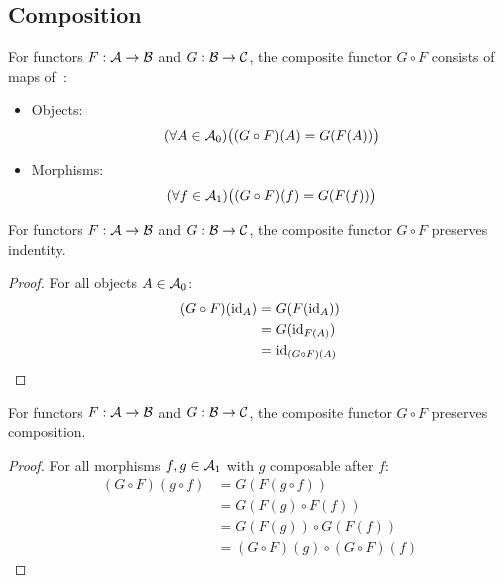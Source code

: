 \subsection{Composition}

\begin{definition}\label{def:functor_composition}

  For functors $F:\mathcal{A}\to \mathcal{B}$ and $G:\mathcal{B}\to \mathcal{C}$, the composite functor $G\circ F$
  consists of maps of~\parencite[p.~17]{leinster:basic_category_theory}:
  \begin{itemize}
    \item Objects:
      \[(\forall A \in \mathcal{A}_0)
        \big((G\circ F)(A) = G(F(A))\big)\]
    \item Morphisms:
      \[(\forall f\in \mathcal{A}_1)
        \big((G\circ F)(f) = G(F(f))\big)\]
  \end{itemize}
\end{definition}

\begin{theorem}
  For functors $F:\mathcal{A}\to \mathcal{B}$ and $G:\mathcal{B}\to \mathcal{C}$, the composite functor $G\circ F$
  preserves indentity.

  \begin{proof}
    For all objects $A\in \mathcal{A}_0$:
    \[
      \begin{aligned}
        (G\circ F)(\mathrm{id}_A)
        &= G(F(\mathrm{id}_A))\\
        &= G(\mathrm{id}_{F(A)})\\
        &= \mathrm{id}_{(G\circ F)(A)}
      \end{aligned}
    \]
  \end{proof}
  \vspace{-\baselineskip}
\end{theorem}

\begin{theorem}
  For functors $F:\mathcal{A}\to \mathcal{B}$ and $G:\mathcal{B}\to \mathcal{C}$, the composite functor $G\circ F$
  preserves composition.

  \begin{proof}
    For all morphisms $f,g\in \mathcal{A}_1$ with $g$ composable after $f$:
    \[
      \begin{aligned}
        (G\circ F)(g\circ f)
        &= G(F(g\circ f))\\
        &= G(F(g)\circ F(f))\\
        &= G(F(g))\circ G(F(f))\\
        &= (G\circ F)(g)\circ(G\circ F)(f)
      \end{aligned}
    \]
  \end{proof}
  \vspace{-\baselineskip}
\end{theorem}


